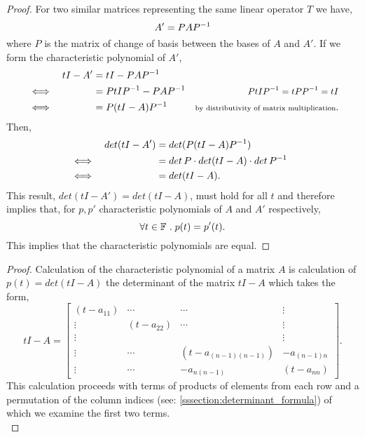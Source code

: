 \documentclass[../MathsNotesBase.tex]{subfiles}
\begin{document}
{		\bigskip
		\begin{proof}
			For two similar matrices representing the same linear operator $T$ we have,
			\[ A' = PA{P}^{-1} \]
			where $P$ is the matrix of change of basis between the bases of $A$ and $A'$. If we form the characteristic polynomial of $A'$,
			\begin{align*}
			&& tI - A' &= tI - PA{P}^{-1} \\
			&\iff &  &= PtI{P}^{-1} - PA{P}^{-1} &\text{\scriptsize{\small{${ PtI{P}^{-1} = tP{P}^{-1} = tI }$}}} \\
			&\iff &  &= P(tI - A){P}^{-1} &\text{\scriptsize{by distributivity of matrix multiplication}}. \\
			\end{align*}
			Then,
			\begin{align*}
			&& det(tI - A') &= det(P(tI - A){P}^{-1}) \\
			&\iff &  &= det\,P \cdot det(tI - A) \cdot det\,{P}^{-1} & \\
			&\iff &  &= det(tI - A). & \\
			\end{align*}
			This result, ${ det(tI - A') = det(tI - A) }$, must hold for all $t$ and therefore implies that, for $p,p'$ characteristic polynomials of $A$ and $A'$ respectively,
			\[ \forall t \in \mathbb{F}^{} \;.\; p(t) = p'(t). \]
			This implies that the characteristic polynomials are equal.
		\end{proof}
	
		\bigskip
		\begin{proof}
			Calculation of the characteristic polynomial of a matrix $A$ is calculation of ${ p(t) = det(tI - A) }$ the determinant of the matrix ${ tI - A }$ which takes the form,
			\[
				tI - A = \begin{bmatrix}
						(t - a_{11}) & \cdots & \cdots 			   & \vdots\\
						\vdots & (t - a_{22}) & \cdots 			   & \vdots\\
						\vdots &   			&  					   & \vdots\\
						\vdots & \cdots 	& (t - a_{(n-1)(n-1)}) & -a_{(n-1)n}\\
						\vdots & \cdots 	& -a_{n(n-1)} 		   & (t - a_{nn})
						\end{bmatrix}.
			\]
			This calculation proceeds with terms of products of elements from each row and a permutation of the column indices (see: \ref{sssection:determinant_formula}) of which we examine the first two terms.\\
			

\end{proof}}
\end{document}
